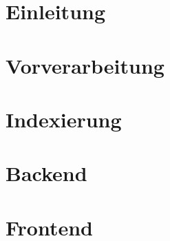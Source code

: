 




\pagestyle{empty} %



\pagestyle{useheadings} %
\setcounter{tocdepth}{3}    %
\setcounter{secnumdepth}{3} %

\tableofcontents %









\chapter{Einleitung}\label{ch:intro}


\chapter{Vorverarbeitung}\label{ch:prepros}


\chapter{Indexierung}\label{ch:indexing}


\chapter{Backend}\label{ch:backend}


\chapter{Frontend}\label{ch:frontend} 
 

